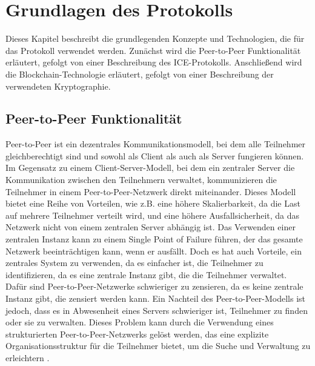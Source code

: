 \section{Grundlagen des Protokolls}
\label{sec:grundlagen_des_protokolls}

Dieses Kapitel beschreibt die grundlegenden Konzepte und Technologien, die für das Protokoll verwendet werden. Zunächst wird die Peer-to-Peer Funktionalität erläutert, gefolgt von einer Beschreibung des ICE-Protokolls. Anschließend wird die Blockchain-Technologie erläutert, gefolgt von einer Beschreibung der verwendeten Kryptographie.

\subsection{Peer-to-Peer Funktionalität}
\label{subsec:peer_to_peer_funktionalitaet}

Peer-to-Peer ist ein dezentrales Kommunikationsmodell, bei dem alle Teilnehmer gleichberechtigt sind und sowohl als Client als auch als Server fungieren können. Im Gegensatz zu einem Client-Server-Modell, bei dem ein zentraler Server die Kommunikation zwischen den Teilnehmern verwaltet, kommunizieren die Teilnehmer in einem Peer-to-Peer-Netzwerk direkt miteinander. Dieses Modell bietet eine Reihe von Vorteilen, wie z.B. eine höhere Skalierbarkeit, da die Last auf mehrere Teilnehmer verteilt wird, und eine höhere Ausfallsicherheit, da das Netzwerk nicht von einem zentralen Server abhängig ist. 
Das Verwenden einer zentralen Instanz kann zu einem Single Point of Failure führen, der das gesamte Netzwerk beeinträchtigen kann, wenn er ausfällt. Doch es hat auch Vorteile, ein zentrales System zu verwenden, da es einfacher ist, die Teilnehmer zu identifizieren, da es eine zentrale Instanz gibt, die die Teilnehmer verwaltet. Dafür sind Peer-to-Peer-Netzwerke schwieriger zu zensieren, da es keine zentrale Instanz gibt, die zensiert werden kann. Ein Nachteil des Peer-to-Peer-Modells ist jedoch, dass es in Abwesenheit eines Servers schwieriger ist, Teilnehmer zu finden oder sie zu verwalten. Dieses Problem kann durch die Verwendung eines strukturierten Peer-to-Peer-Netzwerks gelöst werden, das eine explizite Organisationsstruktur für die Teilnehmer bietet, um die Suche und Verwaltung zu erleichtern \parencite{Luntovskyy_ModRechnernetze}.


